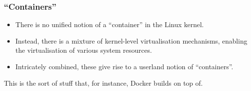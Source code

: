 \begin{frame}

\frametitle{``Containers''}

\footnotesize

\vspace{\fill}

\begin{itemize}

\item There is no unified notion of a ``container'' in the Linux kernel.

\item Instead, there is a mixture of kernel-level virtualisation mechanisms,
enabling the virtualisation of various system resources.

\item Intricately combined, these give rise to a userland notion of
``containers''.

\end{itemize}

\vspace{\fill}

\begin{center}

This is the sort of stuff that, for instance, Docker builds on top of.

\end{center}

\vspace{\fill}

\end{frame}
